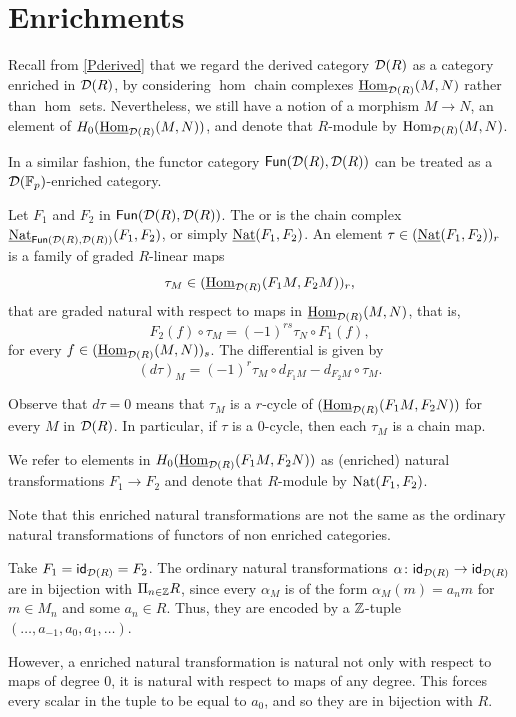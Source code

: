
\section{Enrichments}\label{enrichments}

Recall from \cref{Pderived} that we regard the derived category \(\mathcal{D}(R)\) as a category enriched in \(\mathcal{D}(R)\), by considering \(\hom\) chain complexes \(\underline{\mathrm{Hom}}_{\mathcal{D}(R)}(M,N)\) rather than \(\hom\) sets.
Nevertheless, we still have a notion of a morphism \(M \to N\), an element of \(H_0 (\underline{\mathrm{Hom}}_{\mathcal{D}(R)}(M,N))\), and denote that \(R\)-module by \(\mathrm{Hom}_{\mathcal{D}(R)}(M,N)\).

In a similar fashion, the functor category \(\mathsf{Fun}(\mathcal{D}(R),\mathcal{D}(R))\) can be treated as a \(\mathcal{D}({\mathbb{F}_p})\)-enriched category.

\begin{definition}
	Let \(F_1\) and \(F_2\) in \(\mathsf{Fun}(\mathcal{D}(R),\mathcal{D}(R))\). The  or  is the chain complex \(\underline{\operatorname{Nat}}_{\mathsf{Fun}(\mathcal{D}(R),\mathcal{D}(R))}(F_1,F_2)\), or simply \(\underline{\operatorname{Nat}}(F_1,F_2)\).
	An element \(\tau \in (\underline{\operatorname{Nat}}(F_1,F_2))_r\) is a family of graded \(R\)-linear maps
	\[
	\tau_{M} \in (\underline{\mathrm{Hom}}_{\mathcal{D}(R)}(F_1M, F_2 M))_r,
	\]
	that are graded natural with respect to maps in \(\underline{\mathrm{Hom}}_{\mathcal{D}(R)}(M, N)\), that is,
	\[
	F_2(f) \circ \tau_M = (-1)^{rs} \tau_N \circ F_1(f),
	\]
	for every \(f\in (\underline{\mathrm{Hom}}_{\mathcal{D}(R)}(M, N))_s\).
	The differential is given by
	\[
	(d\tau)_M = (-1)^r \tau_M \circ d_{F_1M} - d_{F_2M} \circ \tau_M.
	\]
\end{definition}

Observe that \(d\tau = 0\) means that \(\tau_M\) is a \(r\)-cycle of \((\underline{\mathrm{Hom}}_{\mathcal{D}(R)}(F_1M, F_2N))\) for every \(M\) in \(\mathcal{D}(R)\).
In particular, if \(\tau\) is a \(0\)-cycle, then each \(\tau_M\) is a chain map.

We refer to elements in \(H_0(\underline{\mathrm{Hom}}_{\mathcal{D}(R)}(F_1M, F_2N))\) as (enriched) natural transformations \(F_1 \to F_2\) and denote that \(R\)-module by \(\operatorname{Nat}(F_1,F_2)\).

\begin{remark}
	Note that this enriched natural transformations are not the same as the ordinary natural transformations of functors of non enriched categories.
	
	Take \(F_1 = \mathsf{id}_{\mathcal{D}(R)} = F_2\).
	The ordinary natural transformations \(\alpha \colon \mathsf{id}_{\mathcal{D}(R)} \to \mathsf{id}_{\mathcal{D}(R)}\) are in bijection with \(\Pi_{n\in \mathbb{Z}} R\), since every \(\alpha_M\) is of the form \(\alpha_M(m)=a_n m\) for \(m\in M_n\) and some \(a_n\in R\). Thus, they are encoded by a \(\mathbb{Z}\)-tuple \((\dots, a_{-1}, a_0, a_1, \dots)\).
	
	However, a enriched natural transformation is natural not only with respect to maps of degree \(0\), it is natural with respect to maps of any degree. This forces every scalar in the tuple to be equal to \(a_0\), and so they are in bijection with \(R\).
\end{remark}

